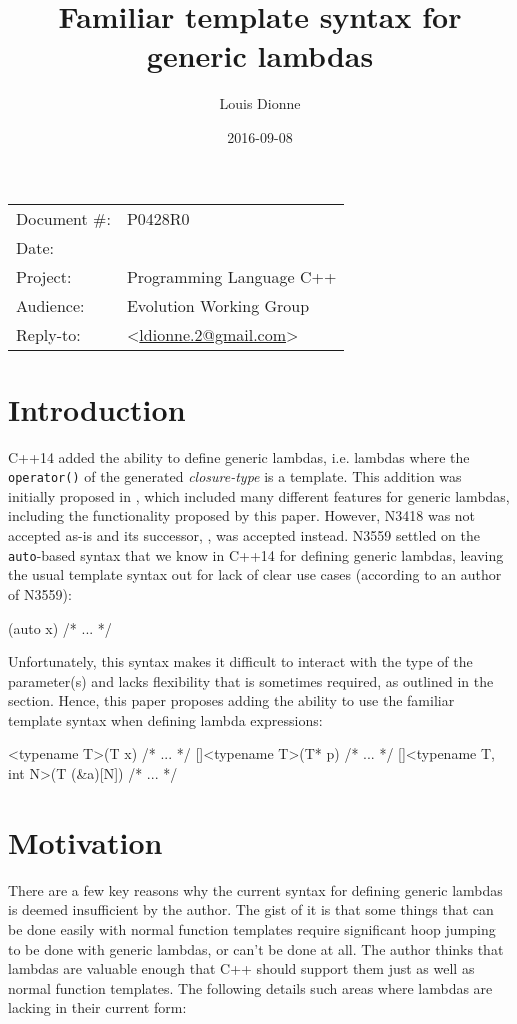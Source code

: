 \documentclass[11pt]{article}
\date{}
\title{Familiar template syntax for generic lambdas}
\author{}
\newcommand{\cc}[1]{\texttt{#1}}
\begin{document}
\maketitle\vspace{-2cm}

\begin{flushright}
  \begin{tabular}{ll}
  Document \#:&P0428R0\\
  Date:       &\date{2016-09-08}\\
  Project:    &Programming Language C++\\
  Audience:   &Evolution Working Group\\
  Reply-to:   &\author{Louis Dionne} \textless\href{mailto:ldionne.2@gmail.com}{ldionne.2@gmail.com}\textgreater
  \end{tabular}
\end{flushright}


\section{Introduction}
C++14 added the ability to define generic lambdas, i.e. lambdas where the
\cc{operator()} of the generated \textit{closure-type} is a template. This
addition was initially proposed in \cite{N3418}, which included many different
features for generic lambdas, including the functionality proposed by this
paper. However, N3418 was not accepted as-is and its successor,
\cite{N3559}, was accepted instead. N3559 settled on the \cc{auto}-based
syntax that we know in C++14 for defining generic lambdas, leaving the
usual template syntax out for lack of clear use cases (according to an author
of N3559):

\begin{cpp}
[](auto x) { /* ... */ }
\end{cpp}

Unfortunately, this syntax makes it difficult to interact with the type of the
parameter(s) and lacks flexibility that is sometimes required, as outlined in
the  section. Hence, this paper proposes adding the ability
to use the familiar template syntax when defining lambda expressions:

\begin{cpp}
[]<typename T>(T x) { /* ... */ }
[]<typename T>(T* p) { /* ... */ }
[]<typename T, int N>(T (&a)[N]) { /* ... */ }
\end{cpp}


\section{Motivation} \label{motivation}
There are a few key reasons why the current syntax for defining generic lambdas
is deemed insufficient by the author. The gist of it is that some things that
can be done easily with normal function templates require significant hoop
jumping to be done with generic lambdas, or can't be done at all. The author
thinks that lambdas are valuable enough that C++ should support them just as
well as normal function templates. The following details such areas where
lambdas are lacking in their current form:
\end{document}
